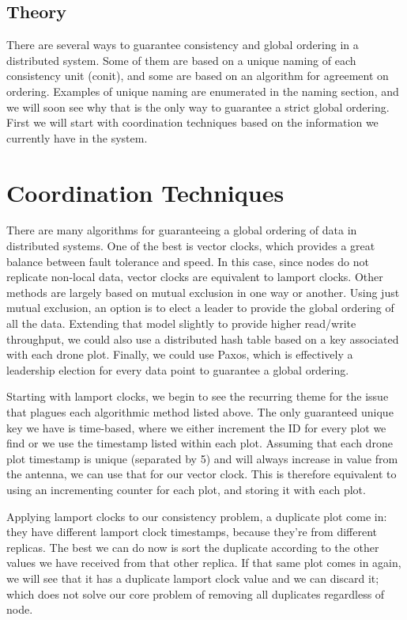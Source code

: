 \documentclass{article}
\begin{document}
\begin{multicols*}{2}
\subsection{Theory}
There are several ways to guarantee consistency and global ordering in a distributed system.  Some of them are based on a unique naming of each consistency unit (conit), and some are based on an algorithm for agreement on ordering.  Examples of unique naming are enumerated in the naming section, and we will soon see why that is the only way to guarantee a strict global ordering.  First we will start with coordination techniques based on the information we currently have in the system.

\section{Coordination Techniques}
There are many algorithms for guaranteeing a global ordering of data in distributed systems.  One of the best is vector clocks, which provides a great balance between fault tolerance and speed.  In this case, since nodes do not replicate non-local data, vector clocks are equivalent to lamport clocks.  Other methods are largely based on mutual exclusion in one way or another.  Using just mutual exclusion, an option is to elect a leader to provide the global ordering of all the data.  Extending that model slightly to provide higher read/write throughput, we could also use a distributed hash table based on a key associated with each drone plot.  Finally, we could use Paxos, which is effectively a leadership election for every data point to guarantee a global ordering.

Starting with lamport clocks, we begin to see the recurring theme for the issue that plagues each algorithmic method listed above.  The only guaranteed unique key we have is time-based, where we either increment the ID for every plot we find or we use the timestamp listed within each plot.  Assuming that each drone plot timestamp is unique (separated by 5) and will always increase in value from the antenna, we can use that for our vector clock.  This is therefore equivalent to using an incrementing counter for each plot, and storing it with each plot.

Applying lamport clocks to our consistency problem, a duplicate plot come in: they have different lamport clock timestamps, because they're from different replicas.  The best we can do now is sort the duplicate according to the other values we have received from that other replica.  If that same plot comes in again, we will see that it has a duplicate lamport clock value and we can discard it; which does not solve our core problem of removing all duplicates regardless of node.


\end{multicols*}
\end{document}
